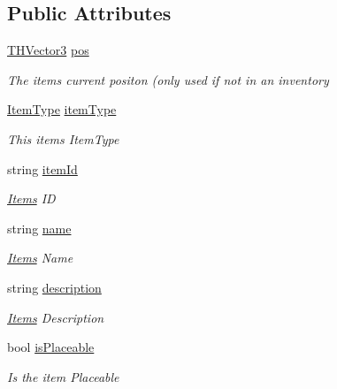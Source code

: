 \subsection*{Public Attributes}
\begin{DoxyCompactItemize}
\item 
\hyperlink{struct_bee_game_1_1_t_h_vector3}{T\+H\+Vector3} \hyperlink{struct_bee_game_1_1_items_1_1_item_a1343526a0c4c00b82b75513e7852e112}{pos}
\begin{DoxyCompactList}\small\item\em The items current positon (only used if not in an inventory \end{DoxyCompactList}\item 
\hyperlink{namespace_bee_game_1_1_enums_aa1fa1a04627915b8e72d3bb1c5c3fa82}{Item\+Type} \hyperlink{struct_bee_game_1_1_items_1_1_item_a496672c00ab90403cbbbac6fab48f8ba}{item\+Type}
\begin{DoxyCompactList}\small\item\em This items Item\+Type \end{DoxyCompactList}\item 
string \hyperlink{struct_bee_game_1_1_items_1_1_item_aa85bfeab893271c26f8ca41b638ada1c}{item\+Id}
\begin{DoxyCompactList}\small\item\em \hyperlink{namespace_bee_game_1_1_items}{Items} ID \end{DoxyCompactList}\item 
string \hyperlink{struct_bee_game_1_1_items_1_1_item_a0b0bd7eb510757f650f1be3d05b23fc8}{name}
\begin{DoxyCompactList}\small\item\em \hyperlink{namespace_bee_game_1_1_items}{Items} Name \end{DoxyCompactList}\item 
string \hyperlink{struct_bee_game_1_1_items_1_1_item_a3173b5fb0a51e9063335e5cbf93c2e1b}{description}
\begin{DoxyCompactList}\small\item\em \hyperlink{namespace_bee_game_1_1_items}{Items} Description \end{DoxyCompactList}\item 
bool \hyperlink{struct_bee_game_1_1_items_1_1_item_ae95da57ec69cdb64b656caa5aa42b8c7}{is\+Placeable}
\begin{DoxyCompactList}\small\item\em Is the item Placeable \end{DoxyCompactList}\item 

\end{DoxyCompactItemize}
